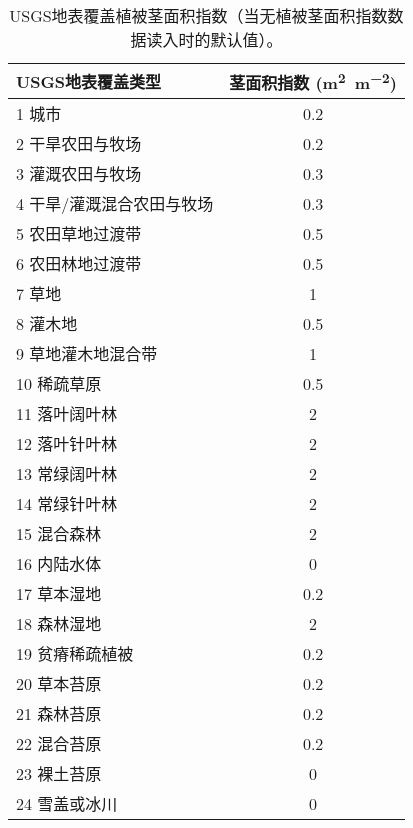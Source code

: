 \begin{table}[]
\centering
\caption{USGS地表覆盖植被茎面积指数（当无植被茎面积指数数据读入时的默认值）。}
\label{tab:USGS地表覆盖植被茎面积指数}
\begin{tabular}{@{}lc@{}}
\toprule
USGS地表覆盖类型     & 茎面积指数 (\unit{m^2.m^{-2}}) \\ \midrule
1 城市           & 0.2       \\
2 干旱农田与牧场      & 0.2       \\
3 灌溉农田与牧场      & 0.3       \\
4 干旱/灌溉混合农田与牧场 & 0.3       \\
5 农田草地过渡带      & 0.5       \\
6 农田林地过渡带      & 0.5       \\
7 草地           & 1         \\
8 灌木地          & 0.5       \\
9 草地灌木地混合带     & 1         \\
10 稀疏草原        & 0.5       \\
11 落叶阔叶林       & 2         \\
12 落叶针叶林       & 2         \\
13 常绿阔叶林       & 2         \\
14 常绿针叶林       & 2         \\
15 混合森林        & 2         \\
16 内陆水体        & 0         \\
17 草本湿地        & 0.2       \\
18 森林湿地        & 2         \\
19 贫瘠稀疏植被      & 0.2       \\
20 草本苔原        & 0.2       \\
21 森林苔原        & 0.2       \\
22 混合苔原        & 0.2       \\
23 裸土苔原        & 0         \\
24 雪盖或冰川       & 0         \\\bottomrule
\end{tabular}
\end{table}

